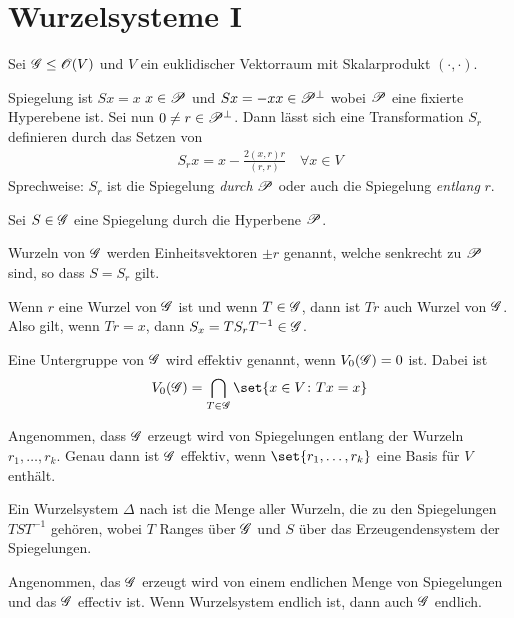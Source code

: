 \addtocounter{section}{3}
\section{Wurzelsysteme I}
Sei $\G \le \O(V)$ und $V$ ein euklidischer Vektorraum mit Skalarprodukt $(\cdot, \cdot)$.
\begin{*definition}
	Spiegelung ist $Sx = x$ $x \in \P$ und $Sx = -x x \in \P^{\perp}$ wobei $\P$ eine fixierte Hyperebene ist. Sei nun $0 \neq r \in \P^{\perp}$. Dann lässt sich eine Transformation $S_r$ definieren durch das Setzen von
	\begin{align*}
		S_r x = x - \frac{2(x,r)r}{(r,r)} \quad \forall x \in V
	\end{align*}
	Sprechweise: $S_r$ ist die Spiegelung \emph{durch} $\P$ oder auch die Spiegelung \emph{entlang} $r$.
\end{*definition}
Sei $S \in \G$ eine Spiegelung durch die Hyperbene $\P$.
\begin{*definition}
	Wurzeln von $\G$ werden Einheitsvektoren $\pm r$ genannt, welche senkrecht zu $\P$ sind, so dass $S = S_r$ gilt.
\end{*definition}
\begin{proposition}
	Wenn $r$ eine Wurzel von $\G$ ist und wenn $T \in\G$, dann ist $Tr$ auch Wurzel von $\G$. Also gilt, wenn $Tr = x$, dann $S_x = TS_r T^{-1} \in \G$.
\end{proposition}
\begin{*definition}
	Eine Untergruppe von $\G$ wird effektiv genannt, wenn $V_0(\G) = 0$ ist. Dabei ist 
	\begin{align*}
		V_0(\G) = \bigcap_{T \in \G} \set{x \in V \colon Tx = x}	
	\end{align*}
\end{*definition}
\begin{proposition}
	Angenommen, dass $\G$ erzeugt wird von Spiegelungen entlang der Wurzeln $r_1, \dots, r_k$. Genau dann ist $\G$ effektiv, wenn $\set{r_1, \dots, r_k}$ eine Basis für $V$ enthält.
\end{proposition}
\begin{*definition}
	Ein Wurzelsystem $\Delta$ nach  ist die Menge aller Wurzeln, die zu den Spiegelungen $TST^{-1}$ gehören, wobei $T$ Ranges über $\G$ und $S$ über das Erzeugendensystem der Spiegelungen.
\end{*definition}
\begin{proposition}
	Angenommen, das $\G$ erzeugt wird von einem endlichen Menge von Spiegelungen und das $\G$ effectiv ist. Wenn Wurzelsystem endlich ist, dann auch $\G$ endlich.
\end{proposition}
